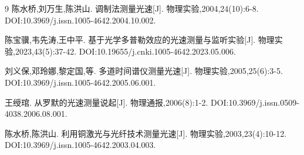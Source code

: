 \documentclass{Phyport}
\begin{document}
\begin{thebibliography}{9}
    陈水桥,刘万生,陈洪山. 调制法测量光速[J]. 物理实验,2004,24(10):6-8. DOI:10.3969/j.issn.1005-4642.2004.10.002.

    陈宝骥,韦先涛,王中平. 基于光学多普勒效应的光速测量与监听实验[J]. 物理实验,2023,43(5):37-42. DOI:10.19655/j.cnki.1005-4642.2023.05.006. 

    刘义保,邓玲娜,黎定国,等. 多道时间谱仪测量光速[J]. 物理实验,2005,25(6):3-5. DOI:10.3969/j.issn.1005-4642.2005.06.001. 

    王绶琯. 从罗默的光速测量说起[J]. 物理通报,2006(8):1-2. DOI:10.3969/j.issn.0509-4038.2006.08.001. 

    陈水桥,陈洪山. 利用铜激光与光纤技术测量光速[J]. 物理实验,2003,23(4):10-12. DOI:10.3969/j.issn.1005-4642.2003.04.003. 
\end{thebibliography}


\end{document}
